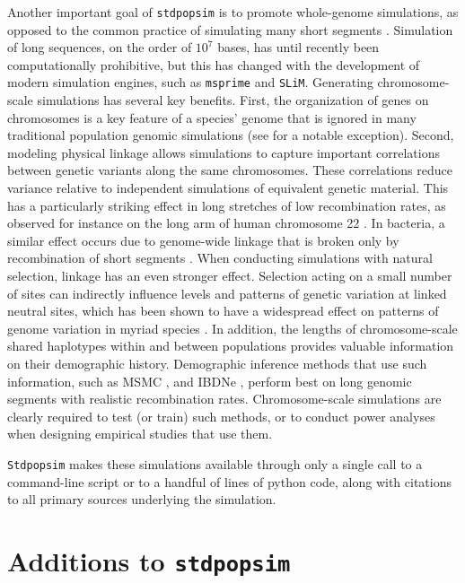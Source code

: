 \documentclass[hidelinks]{article}
\newcommand{\Stdpopsim}{\texttt{Stdpopsim}\xspace}
\newcommand{\stdpopsim}{\texttt{stdpopsim}\xspace}
\begin{document}
Another important goal of \stdpopsim is to promote whole-genome simulations,
as opposed to the common practice of simulating many short segments  \citep[see, e.g.,][]{harris2016genetic}.
Simulation of long sequences, on the order of $10^7$ bases,
has until recently been computationally prohibitive,
but this has changed with the development of modern simulation engines,
such as \texttt{msprime} and \texttt{SLiM}.
Generating chromosome-scale simulations has several key benefits.
First, the organization of genes on chromosomes is a key feature of a species' genome that is ignored in many traditional population genomic simulations
 (see \cite{schrider2020background} for a notable exception).
Second, modeling physical linkage allows simulations to capture
important correlations between genetic variants along the same chromosomes.
These correlations reduce variance relative to independent simulations of equivalent genetic material.
This has a particularly striking effect in long stretches of low recombination rates,
as observed for instance on the long arm of human chromosome 22 \citep{Dawson2002}.
In bacteria, a similar effect occurs due to genome-wide linkage that is broken only
by recombination of short segments \citep{Didelot2010}.
When conducting simulations with natural selection, linkage has
an even stronger effect. Selection acting on a small number of sites can
indirectly influence levels and patterns of genetic variation at linked neutral sites,
which has been shown to have a widespread
effect on patterns of genome variation in myriad species
\citep[e.g.,][]{McVicker2009,Charlesworth2012}. 
In addition, the lengths of chromosome-scale shared haplotypes within and
between populations provides valuable information on their demographic history.
Demographic inference methods that use such information,
such as MSMC \citep{Schiffels2020}, and IBDNe \citep{browning2015accurate},
perform best on long genomic segments with realistic recombination rates.
Chromosome-scale simulations are clearly required to test (or train) such methods,
or to conduct power analyses when designing empirical studies that use them.

\Stdpopsim makes these simulations available
through only a single call to a command-line script
or to a handful of lines of python code,
along with citations to all primary sources underlying the simulation.


\section*{Additions to \stdpopsim}
    \label{sec:expanded-catalog}
\end{document}
